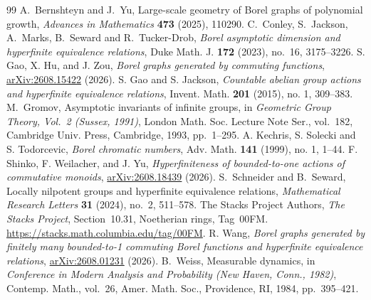 \documentclass[10pt,a4paper]{amsart}
\begin{document}
\begin{thebibliography}{99}
 A.~Bernshteyn and J.~Yu, \newblock Large-scale geometry of Borel graphs of polynomial growth, \newblock \emph{Advances in Mathematics} \textbf{473} (2025), 110290.
 C.~Conley, S.~Jackson, A.~Marks, B.~Seward and R.~Tucker-Drob, \emph{Borel asymptotic dimension and hyperfinite equivalence relations}, Duke Math. J. \textbf{172} (2023), no.~16, 3175--3226.
 S. Gao, X. Hu, and J. Zou, \emph{Borel graphs generated by commuting functions}, \href{https://arxiv.org/abs/2608.15422}{arXiv:2608.15422} (2026).
 S. Gao and S. Jackson, \emph{Countable abelian group actions and hyperfinite equivalence relations}, Invent. Math. \textbf{201} (2015), no. 1, 309--383.
 M.~Gromov, Asymptotic invariants of infinite groups, in \emph{Geometric Group Theory, Vol.~2 (Sussex, 1991)}, London Math. Soc. Lecture Note Ser., vol.~182, Cambridge Univ. Press, Cambridge, 1993, pp.~1--295.
 A. Kechris, S. Solecki and S. Todorcevic, \emph{Borel chromatic numbers}, Adv. Math. \textbf{141} (1999), no. 1, 1--44.
 F. Shinko, F. Weilacher, and J. Yu, \emph{Hyperfiniteness of bounded-to-one actions of commutative monoids}, \href{https://arxiv.org/abs/2608.18439}{arXiv:2608.18439} (2026).
 S.~Schneider and B.~Seward, \newblock Locally nilpotent groups and hyperfinite equivalence relations, \newblock \emph{Mathematical Research Letters} \textbf{31} (2024), no.~2, 511--578.
 The Stacks Project Authors, \emph{The Stacks Project}, Section~10.31, Noetherian rings, Tag~00FM. \url{https://stacks.math.columbia.edu/tag/00FM}.
 R. Wang, \emph{Borel graphs generated by finitely many bounded-to-1 commuting Borel functions and hyperfinite equivalence relations}, \href{https://arxiv.org/abs/2608.01231}{arXiv:2608.01231} (2026).
 B.~Weiss, Measurable dynamics, in \emph{Conference in Modern Analysis and Probability (New Haven, Conn., 1982)}, Contemp. Math., vol.~26, Amer. Math. Soc., Providence, RI, 1984, pp.~395--421.
\end{thebibliography}
\end{document}
